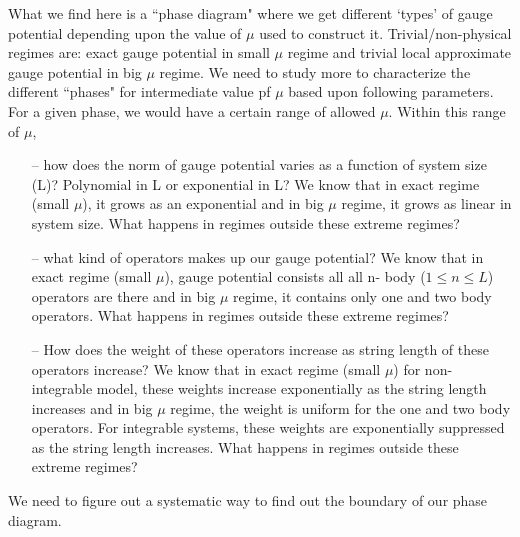 \documentclass[11pt,a4paper]{article}
\begin{document}
What we find here is a ``phase diagram" where we get different `types' of gauge potential depending upon the value of $\mu$ used to construct it. Trivial/non-physical regimes are: exact gauge potential in small $\mu$ regime and trivial local approximate gauge potential in big $\mu$ regime.   We need to study more to characterize the different ``phases" for intermediate value pf $\mu$ based upon following parameters. For a given phase, we would have a certain range of allowed $\mu$. Within this range of $\mu$,
\begin{itemize}
\item[--] how does the norm of gauge potential varies as a function of system size (L)? Polynomial in L or exponential in L? We know that in exact regime (small $\mu$), it grows as an exponential and in big $\mu$ regime, it grows as linear in system size. What happens in regimes outside these extreme regimes?
\item[--] what kind of operators makes up our gauge potential? We know that in exact regime (small $\mu$), gauge potential consists all all n- body ($1 \leq n \leq L$) operators are there and in big $\mu$ regime, it contains only one and two body operators. What happens in regimes outside these extreme regimes?
\item[--] How does the weight of these operators increase as string length of these operators increase? We know that in exact regime (small $\mu$) for non-integrable model, these weights increase exponentially as the string length increases  and in big $\mu$ regime, the weight is uniform for the one and two body operators. For integrable systems, these weights are exponentially suppressed as the string length increases.  What happens in regimes outside these extreme regimes?
\end{itemize}


We need to figure out a systematic way to find out the boundary of our phase diagram.
\end{document}
